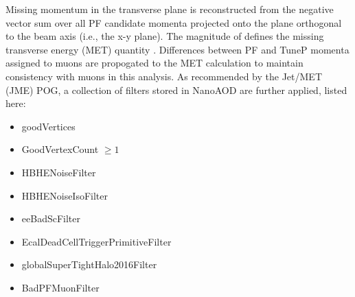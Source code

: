Missing momentum in the transverse plane \ptvecmiss is reconstructed from the negative vector sum over all PF candidate momenta projected onto the plane orthogonal to the beam axis (i.e., the x-y plane). The magnitude of \ptvecmiss defines the missing transverse energy (MET) quantity \MET. Differences between PF and TuneP momenta assigned to muons are propogated to the MET calculation to maintain consistency with muons in this analysis. As recommended by the Jet/MET (JME) POG, a collection of filters stored in NanoAOD are further applied, listed here:

\begin{itemize}
    \item {goodVertices}
    \item {GoodVertexCount} $\geq 1$
    \item {HBHENoiseFilter}
    \item {HBHENoiseIsoFilter}
    \item {eeBadScFilter}
    \item {EcalDeadCellTriggerPrimitiveFilter}
    \item {globalSuperTightHalo2016Filter}
    \item {BadPFMuonFilter}
\end{itemize}